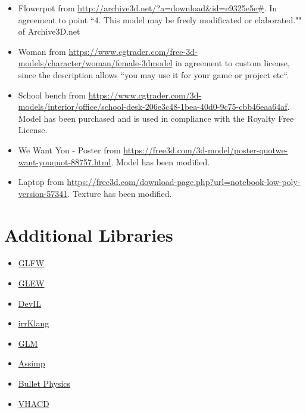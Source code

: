 \documentclass[12pt]{article}
\begin{document}
\begin{itemize}
\item Flowerpot from \url{http://archive3d.net/?a=download\&id=e9325e5e#}. In agreement to point ``4. This model may be freely modificated or elaborated."" of Archive3D.net

\item Woman from \url{https://www.cgtrader.com/free-3d-models/character/woman/female-3dmodel} in agreement to custom license, since the description allows ``you may use it for your game or project etc``.

\item School bench from
\url{ https://www.cgtrader.com/3d-models/interior/office/school-desk-206e3c48-1bea-40d0-9c75-cbb46eaa64af}. Model has been purchased and is used in compliance with the Royalty Free License.

\item We Want You - Poster from
\url{https://free3d.com/3d-model/poster-quotwe-want-youquot-88757.html}. Model has been modified.

\item Laptop from
\url{https://free3d.com/download-page.php?url=notebook-low-poly-version-57341}. Texture has been modified.

\end{itemize}


\section{Additional Libraries}

\begin{itemize}
\item \href{http://www.glfw.org/}{GLFW}
\item \href{http://glew.sourceforge.net/}{GLEW}
\item \href{http://openil.sourceforge.net/}{DevIL}
\item \href{http://www.ambiera.com/irrklang/index.html}{irrKlang}
\item \href{http://glm.g-truc.net}{GLM }
\item \href{http://www.assimp.org}{Assimp}
\item \href{http://bulletphysics.org/}{Bullet Physics}
\item \href{https://github.com/kmammou/v-hacd}{VHACD}
\end{itemize}
\end{document}
